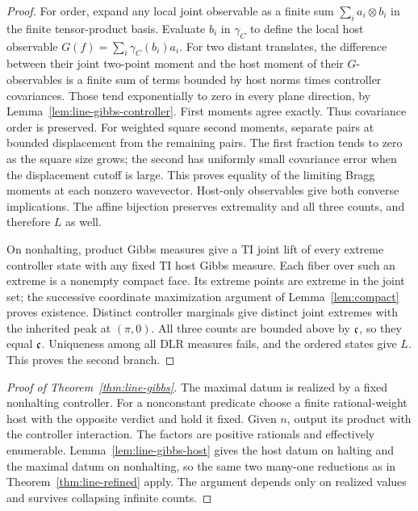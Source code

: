 \begin{proof}
For order, expand any local joint observable as a finite sum
$\sum_i a_i\otimes b_i$ in the finite tensor-product basis. Evaluate
$b_i$ in $\gamma_C$ to define the local host observable
$G(f)=\sum_i\gamma_C(b_i)a_i$. For two distant translates, the difference
between their joint two-point moment and the host moment of their
$G$-observables is a finite sum of terms bounded by host norms times
controller covariances. Those tend exponentially to zero in every
plane direction, by Lemma~\ref{lem:line-gibbs-controller}. First moments
agree exactly. Thus covariance order is preserved. For weighted square
second moments, separate pairs at bounded displacement from the
remaining pairs. The first fraction tends to zero as the square
size grows; the second has uniformly small covariance error when
the displacement cutoff is large. This proves equality of the
limiting Bragg moments at each nonzero wavevector. Host-only
observables give both converse implications. The affine bijection
preserves extremality and all three counts, and therefore $L$ as well.

On nonhalting, product Gibbs measures give a TI joint lift of every
extreme controller state with any fixed TI host Gibbs measure.
Each fiber over such an extreme is a nonempty compact face. Its
extreme points are extreme in the joint set; the successive coordinate
maximization argument of Lemma~\ref{lem:compact} proves existence.
Distinct controller marginals give distinct joint extremes with the
inherited peak at $(\pi,0)$. All three counts are bounded above by
$\mathfrak c$, so they equal $\mathfrak c$. Uniqueness among all DLR measures
fails, and the ordered states give $L$. This proves the second branch.
\end{proof}

\begin{proof}[Proof of Theorem~\ref{thm:line-gibbs}]
The maximal datum is realized by a fixed nonhalting controller.
For a nonconstant predicate choose a finite rational-weight host
with the opposite verdict and hold it fixed. Given $n$, output its
product with the controller interaction. The factors are positive
rationals and effectively enumerable. Lemma~\ref{lem:line-gibbs-host}
gives the host datum on halting and the maximal datum on nonhalting,
so the same two many-one reductions as in
Theorem~\ref{thm:line-refined} apply. The argument depends only on
realized values and survives collapsing infinite counts.
\end{proof}
